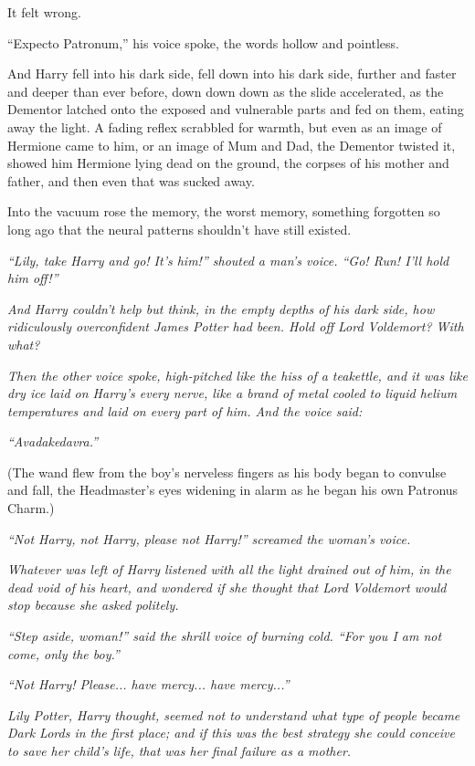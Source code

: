 It felt wrong.

``Expecto Patronum,'' his voice spoke, the words hollow and pointless.

And Harry fell into his dark side, fell down into his dark side, further
and faster and deeper than ever before, down down down as the slide
accelerated, as the Dementor latched onto the exposed and vulnerable
parts and fed on them, eating away the light. A fading reflex scrabbled
for warmth, but even as an image of Hermione came to him, or an image of
Mum and Dad, the Dementor twisted it, showed him Hermione lying dead on
the ground, the corpses of his mother and father, and then even that was
sucked away.

Into the vacuum rose the memory, the worst memory, something forgotten
so long ago that the neural patterns shouldn't have still existed.

\emph{``Lily, take Harry and go! It's him!'' shouted a man's voice.
``Go! Run! I'll hold him off!''}

\emph{And Harry couldn't help but think, in the empty depths of his dark
side, how ridiculously overconfident James Potter had been. Hold off
Lord Voldemort? With what?}

\emph{Then the other voice spoke, high-pitched like the hiss of a
teakettle, and it was like dry ice laid on Harry's every nerve, like a
brand of metal cooled to liquid helium temperatures and laid on every
part of him. And the voice said:}

\emph{``Avadakedavra.''}

(The wand flew from the boy's nerveless fingers as his body began to
convulse and fall, the Headmaster's eyes widening in alarm as he began
his own Patronus Charm.)

\emph{``Not Harry, not Harry, please not Harry!'' screamed the woman's
voice.}

\emph{Whatever was left of Harry listened with all the light drained out
of him, in the dead void of his heart, and wondered if she thought that
Lord Voldemort would stop because she asked politely.}

\emph{``Step aside, woman!'' said the shrill voice of burning cold.
``For you I am not come, only the boy.''}

\emph{``Not Harry! Please... have mercy... have
mercy...''}

\emph{Lily Potter, Harry thought, seemed not to understand what type of
people became Dark Lords in the first place; and if this was the best
strategy she could conceive to save her child's life, that was her final
failure as a mother.}

